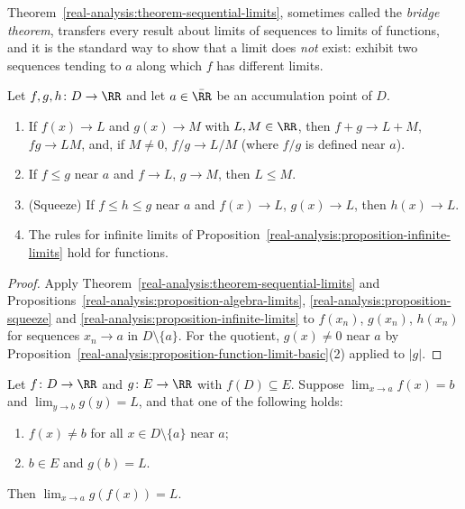 Theorem~\ref{real-analysis:theorem-sequential-limits}, sometimes called the \emph{bridge theorem}, transfers every result about limits of sequences to limits of functions, and it is the standard way to
show that a limit does \emph{not} exist: exhibit two sequences tending to $a$ along which $f$ has different limits.

\begin{corollary}\label{real-analysis:corollary-limit-rules}
Let $f, g, h \colon D \to \RR$ and let $a \in \bar{\RR}$ be an accumulation point of $D$.
\begin{enumerate}
\item If $f(x) \to L$ and $g(x) \to M$ with $L, M \in \RR$, then $f + g \to L + M$, $fg \to LM$, and, if $M \neq 0$, $f/g \to L/M$ (where $f/g$ is defined near $a$).
\item If $f \leq g$ near $a$ and $f \to L$, $g \to M$, then $L \leq M$.
\item (Squeeze) If $f \leq h \leq g$ near $a$ and $f(x) \to L$, $g(x) \to L$, then $h(x) \to L$.
\item The rules for infinite limits of Proposition~\ref{real-analysis:proposition-infinite-limits} hold for functions.
\end{enumerate}
\end{corollary}

\begin{proof}
Apply Theorem~\ref{real-analysis:theorem-sequential-limits} and Propositions~\ref{real-analysis:proposition-algebra-limits}, \ref{real-analysis:proposition-squeeze} and
\ref{real-analysis:proposition-infinite-limits} to $f(x_n)$, $g(x_n)$, $h(x_n)$ for sequences $x_n \to a$ in $D \setminus \{a\}$. For the quotient, $g(x) \neq 0$ near $a$ by
Proposition~\ref{real-analysis:proposition-function-limit-basic}(2) applied to $|g|$.
\end{proof}

\begin{proposition}\label{real-analysis:proposition-composite-limit}
Let $f \colon D \to \RR$ and $g \colon E \to \RR$ with $f(D) \subseteq E$. Suppose $\lim_{x \to a}f(x) = b$ and $\lim_{y \to b}g(y) = L$, and that one of the following holds:
\begin{enumerate}
\item $f(x) \neq b$ for all $x \in D \setminus \{a\}$ near $a$;
\item $b \in E$ and $g(b) = L$.
\end{enumerate}
Then $\lim_{x \to a}g(f(x)) = L$.
\end{proposition}

